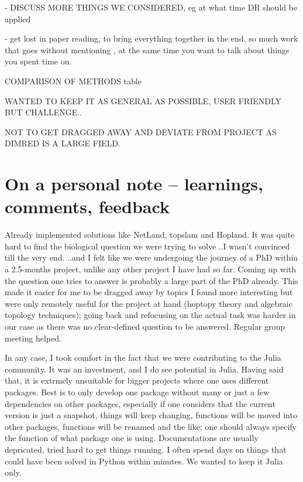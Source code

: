 \documentclass[journal, a4paper]{IEEEtran}
\begin{document}
- DISCUSS MORE THINGS WE CONSIDERED, eg at what time DR should be applied

- get lost in paper reading, to bring everything together in the end, so much work that goes without mentioning , at the same time you want to talk about things you spent time on.

COMPARISON OF METHODS
table

WANTED TO KEEP IT AS GENERAL AS POSSIBLE, USER FRIENDLY BUT CHALLENGE..

NOT TO GET DRAGGED AWAY AND DEVIATE FROM PROJECT AS DIMRED IS A LARGE FIELD.



\section{On a personal note -- learnings, comments, feedback } %


Already implemented solutions like NetLand, topslam and Hopland. It was quite hard to find the biological question we were trying to solve ..I wasn't convinced till the very end. ..and I felt like we were undergoing the journey of a PhD within a 2.5-months project, unlike any other project I have had so far. Coming up with the question one tries to answer is probably a large part of the PhD already. 
This made it easier for me to be dragged away by topics I found more interesting but were only remotely useful for the project at hand (hoptopy theory and algebraic topology techniques); going back and refocusing on the actual task was harder in our case as there was no clear-defined question to be answered. Regular group meeting helped. 

In any case, I took comfort in the fact that we were contributing to the Julia community. It was an investment, and I do see potential in Julia. Having said that, it is extrmely unsuitable for bigger projects where one uses different packages. Best is to only develop one package without many or just a few dependencies on other packages, especially if one considers that the current version is just a snapshot, things will keep changing, functions will be moved into other packages, functions will be renamed and the like; one should always specify the function of what package one is using. Documentations are usually depricated, tried hard to get things running. I often spend days on things that could have been solved in Python within minutes. We wanted to keep it Julia only.
\end{document}
